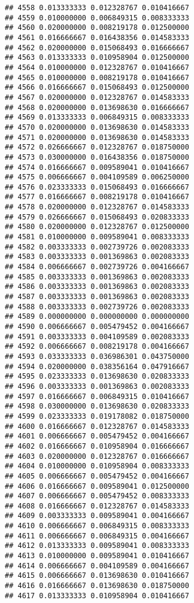 \documentclass[
]{article}
\begin{document}
\begin{verbatim}
## 4558 0.013333333 0.012328767 0.010416667
## 4559 0.010000000 0.006849315 0.008333333
## 4560 0.020000000 0.008219178 0.012500000
## 4561 0.016666667 0.016438356 0.014583333
## 4562 0.020000000 0.015068493 0.016666667
## 4563 0.013333333 0.010958904 0.012500000
## 4564 0.010000000 0.012328767 0.010416667
## 4565 0.010000000 0.008219178 0.010416667
## 4566 0.016666667 0.015068493 0.012500000
## 4567 0.020000000 0.012328767 0.014583333
## 4568 0.020000000 0.013698630 0.016666667
## 4569 0.013333333 0.006849315 0.008333333
## 4570 0.020000000 0.013698630 0.014583333
## 4571 0.020000000 0.013698630 0.014583333
## 4572 0.026666667 0.012328767 0.018750000
## 4573 0.030000000 0.016438356 0.018750000
## 4574 0.016666667 0.009589041 0.010416667
## 4575 0.006666667 0.004109589 0.006250000
## 4576 0.023333333 0.015068493 0.016666667
## 4577 0.016666667 0.008219178 0.010416667
## 4578 0.020000000 0.012328767 0.014583333
## 4579 0.026666667 0.015068493 0.020833333
## 4580 0.020000000 0.012328767 0.012500000
## 4581 0.010000000 0.009589041 0.008333333
## 4582 0.003333333 0.002739726 0.002083333
## 4583 0.003333333 0.001369863 0.002083333
## 4584 0.006666667 0.002739726 0.004166667
## 4585 0.003333333 0.001369863 0.002083333
## 4586 0.003333333 0.001369863 0.002083333
## 4587 0.003333333 0.001369863 0.002083333
## 4588 0.003333333 0.002739726 0.002083333
## 4589 0.000000000 0.000000000 0.000000000
## 4590 0.006666667 0.005479452 0.004166667
## 4591 0.003333333 0.004109589 0.002083333
## 4592 0.006666667 0.008219178 0.004166667
## 4593 0.033333333 0.036986301 0.043750000
## 4594 0.020000000 0.038356164 0.047916667
## 4595 0.023333333 0.013698630 0.020833333
## 4596 0.003333333 0.001369863 0.002083333
## 4597 0.016666667 0.006849315 0.010416667
## 4598 0.030000000 0.013698630 0.020833333
## 4599 0.023333333 0.019178082 0.018750000
## 4600 0.016666667 0.012328767 0.014583333
## 4601 0.006666667 0.005479452 0.004166667
## 4602 0.016666667 0.010958904 0.016666667
## 4603 0.020000000 0.012328767 0.016666667
## 4604 0.010000000 0.010958904 0.008333333
## 4605 0.006666667 0.005479452 0.004166667
## 4606 0.016666667 0.009589041 0.012500000
## 4607 0.006666667 0.005479452 0.008333333
## 4608 0.016666667 0.012328767 0.014583333
## 4609 0.003333333 0.009589041 0.004166667
## 4610 0.006666667 0.006849315 0.008333333
## 4611 0.006666667 0.006849315 0.004166667
## 4612 0.013333333 0.009589041 0.008333333
## 4613 0.010000000 0.009589041 0.010416667
## 4614 0.006666667 0.004109589 0.004166667
## 4615 0.006666667 0.013698630 0.010416667
## 4616 0.016666667 0.013698630 0.018750000
## 4617 0.013333333 0.010958904 0.010416667

\end{verbatim}
\end{document}
